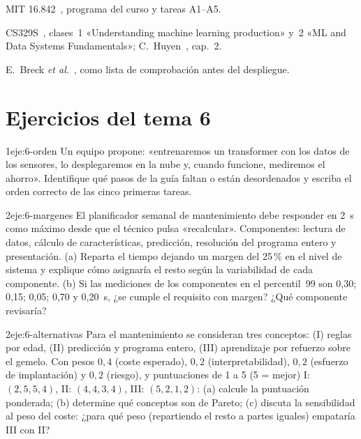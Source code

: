 \begin{lecturas}
\item MIT 16.842~\cite{mit16842}, programa del curso y tareas A1--A5.
\item CS329S~\cite{cs329s}, clases~1 «Understanding machine learning production» y~2 «ML and Data Systems Fundamentals»; C.~Huyen~\cite{huyen}, cap.~2.
\item E.~Breck \emph{et al.}~\cite{breck}, como lista de comprobación antes del despliegue.
\end{lecturas}

\section*{Ejercicios del tema 6}

\begin{ejercicio}{1}{eje:6-orden}
Un equipo propone: «entrenaremos un transformer con los datos de los sensores, lo desplegaremos en la nube y, cuando funcione, mediremos el ahorro». Identifique qué pasos de la guía faltan o están desordenados y escriba el orden correcto de las cinco primeras tareas.
\end{ejercicio}

\begin{ejercicio}{2}{eje:6-margenes}
El planificador semanal de mantenimiento debe responder en 2~s como máximo desde que el técnico pulsa «recalcular». Componentes: lectura de datos, cálculo de características, predicción, resolución del programa entero y presentación. (a) Reparta el tiempo dejando un margen del 25\,\% en el nivel de sistema y explique cómo asignaría el resto según la variabilidad de cada componente. (b) Si las mediciones de los componentes en el percentil~99 son 0{,}30; 0{,}15; 0{,}05; 0{,}70 y 0{,}20~s, ¿se cumple el requisito con margen? ¿Qué componente revisaría?
\end{ejercicio}

\begin{ejercicio}{2}{eje:6-alternativas}
Para el mantenimiento se consideran tres conceptos: (I) reglas por edad, (II) predicción y programa entero, (III) aprendizaje por refuerzo sobre el gemelo. Con pesos $0{,}4$ (coste esperado), $0{,}2$ (interpretabilidad), $0{,}2$ (esfuerzo de implantación) y $0{,}2$ (riesgo), y puntuaciones de 1 a 5 (5 = mejor) I: $(2,5,5,4)$, II: $(4,4,3,4)$, III: $(5,2,1,2)$: (a) calcule la puntuación ponderada; (b) determine qué conceptos son de Pareto; (c) discuta la sensibilidad al peso del coste: ¿para qué peso (repartiendo el resto a partes iguales) empataría III con II?
\end{ejercicio}

